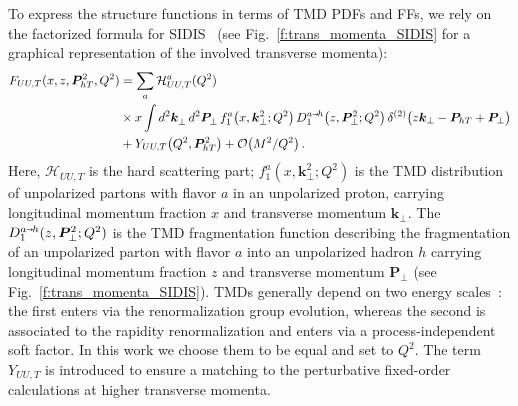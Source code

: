 \documentclass[aps,preprintnumbers,showpacs,nofootinbib,superscriptaddress,floatfix]{revtex4}
\newcommand{\smarrow}{\mbox{\raisebox{-4.5pt}[0pt][0pt]{$\hspace{-1pt} 
		\vec{\phantom{v}}$}}}
\newcommand{\T}{\perp}
\newcommand{\Tperp}{T}
\begin{document}
To express the structure functions in terms of TMD PDFs and FFs, 
we rely on the factorized formula 
for SIDIS~\cite{Collins:1981uk,Collins:1984kg,Ji:2002aa,Ji:2004wu,%
Collins:2011zzd,Aybat:2011zv,GarciaEchevarria:2011rb,Echevarria:2012pw,%
Collins:2012uy} (see Fig.~\ref{f:trans_momenta_SIDIS} for a graphical
representation of the involved transverse momenta):  
\begin{align}
\label{e:SIDISkT}
   F_{UU,T}(x,z, \bm{P}_{h \Tperp}^2, Q^2) &= \sum_a \mathcal{H}_{UU,T}^{a}(Q^2) \\ 
      &\times x \int d^2\bm{k}_\T^{} \, d^2\bm{P}_\T^{} \,  f_1^a\big(x,\bm{k}_{\T}^2; Q^2 \big) \, D_{1}^{a\smarrow h}\big(z,\bm{P}_{\T}^2; Q^2 \big) \,
      \delta^{(2)} \big(z {\bm k}_{\T} - {\bm P}_{h \Tperp} + {\bm P}_{\T}\big)
\nonumber\\&
\nonumber + Y_{UU,T}\big(Q^2, \bm{P}_{h\Tperp}^2\big) + \mathcal{O}\big(M^2/Q^2\big) \, .
\end{align} 
Here, $\mathcal{H}_{UU,T}$ is the hard scattering part; $f_1^a(x,\bm{k}_{\T}^2;Q^2)$ is the TMD distribution of unpolarized partons with flavor $a$ in an unpolarized
proton, carrying longitudinal momentum fraction $x$ and transverse momentum
$\bm{k}_\T$.  The $D_1^{a\smarrow h}(z, \bm{P}_{\T}^2;Q^2)$ is the TMD fragmentation function describing the fragmentation of an unpolarized parton with flavor $a$ into
an unpolarized hadron $h$ carrying longitudinal momentum fraction $z$ and
transverse momentum 
$\bm{P}_\T$ (see Fig.~\ref{f:trans_momenta_SIDIS}).  
TMDs generally depend on two energy scales~\cite{Collins:2011zzd}: the first enters via the renormalization group evolution, whereas the second is associated to the rapidity renormalization and enters via a process-independent soft factor. 
In this work we choose them to be equal and set to $Q^2$. 
The term $Y_{UU,T}$ is introduced to ensure a matching
to the perturbative fixed-order calculations at higher transverse momenta. 
\end{document}
